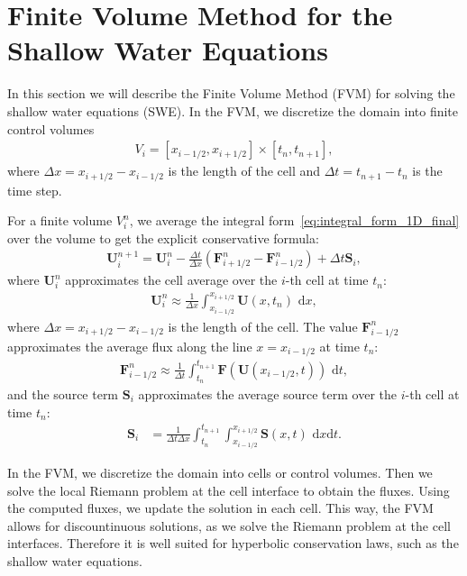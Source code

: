 \section{Finite Volume Method for the Shallow Water Equations}
In this section we will describe the Finite Volume Method (FVM) for solving the shallow water equations (SWE).
In the FVM, we discretize the domain into finite control volumes
\begin{align*}
    V_i = [x_{i-1/2}, x_{i+1/2}] \times [t_n, t_{n+1}],
\end{align*}
where $\Delta x = x_{i+1/2} - x_{i-1/2}$ is the length of the cell and $\Delta t = t_{n+1} - t_n$ is the time step.




For a finite volume $V_i^n$, we average the integral form~\eqref{eq:integral_form_1D_final} over the volume to get the explicit conservative formula:
\begin{align}\label{eq:explicit_conservative_1D_SWE}
    \mathbf{U}_i^{n+1} = \mathbf{U}_i^n - \frac{\Delta t}{\Delta x} \left( \mathbf{F}_{i+1/2}^n - \mathbf{F}_{i-1/2}^n \right) + \Delta t \mathbf{S}_i,
\end{align}
where $\mathbf{U}_i^n$ approximates the cell average over the $i$-th cell at time $t_n$:
\begin{align}
    \mathbf{U}_i^n \approx \frac{1}{\Delta x} \int_{x_{i-1/2}}^{x_{i+1/2}} \mathbf{U}(x,t_n) \text{ d}x,
\end{align}
where $\Delta x = x_{i+1/2} - x_{i-1/2}$ is the length of the cell.
The value $\mathbf{F}_{i-1/2}^n$ approximates the average flux along the line $x = x_{i-1/2}$ at time $t_n$:
\begin{align*}
    \mathbf{F}_{i-1/2}^n \approx \frac{1}{\Delta t} \int_{t_n}^{t_{n+1}} \mathbf{F}(\mathbf{U}(x_{i-1/2},t)) \text{ d}t,
\end{align*}
and the source term $\mathbf{S}_i$ approximates the average source term over the $i$-th cell at time $t_n$:
\begin{align*}
    \mathbf{S}_i &= \frac{1}{\Delta t \Delta x} \int_{t_n}^{t_{n+1}} \int_{x_{i-1/2}}^{x_{i+1/2}} \mathbf{S}(x,t) \text{ d}x\text{d}t.
\end{align*}


In the FVM, we discretize the domain into cells or control volumes.
Then we solve the local Riemann problem at the cell interface to obtain the fluxes.
Using the computed fluxes, we update the solution in each cell.
This way, the FVM allows for discountinuous solutions, as we solve the Riemann problem at the cell interfaces.
Therefore it is well suited for hyperbolic conservation laws, such as the shallow water equations.


